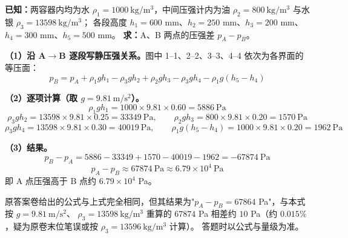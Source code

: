 \begin{jie}
\textbf{已知：}两容器内均为水 $\rho_1=1000\ \mathrm{kg/m^3}$，中间压强计内为油 $\rho_2=800\ \mathrm{kg/m^3}$ 与水银 $\rho_3=13598\ \mathrm{kg/m^3}$；
各段高度 $h_1=600$ mm、$h_2=250$ mm、$h_3=200$ mm、$h_4=300$ mm、$h_5=500$ mm。
\textbf{求：}A、B 两点的压强差 $p_A-p_B$。


\textbf{（1）沿 A$\rightarrow$B 逐段写静压强关系。}图中 1--1、2--2、3--3、4--4 依次为各界面的等压面：
\[
p_B=p_A+\rho_1gh_1-\rho_3gh_2+\rho_2gh_3-\rho_3gh_4-\rho_1g\left(h_5-h_4\right)
\]

\textbf{（2）逐项计算（取 $g=9.81\ \mathrm{m/s^2}$）。}
\[
\rho_1gh_1=1000\times9.81\times0.60=5886\ \mathrm{Pa}
\]
\[
\rho_3gh_2=13598\times9.81\times0.25=33349\ \mathrm{Pa},
\qquad
\rho_2gh_3=800\times9.81\times0.20=1570\ \mathrm{Pa}
\]
\[
\rho_3gh_4=13598\times9.81\times0.30=40019\ \mathrm{Pa},
\qquad
\rho_1g\left(h_5-h_4\right)=1000\times9.81\times0.20=1962\ \mathrm{Pa}
\]

\textbf{（3）结果。}
\[
p_B-p_A=5886-33349+1570-40019-1962=-67874\ \mathrm{Pa}
\]
\[
\boxed{p_A-p_B\approx67874\ \mathrm{Pa}\approx6.79\times10^4\ \mathrm{Pa}}
\]
即 A 点压强高于 B 点约 $6.79\times10^4$ Pa。
\end{jie}

\begin{tishi}
原答案卷给出的公式与上式完全相同，但其结果为"$p_A-p_B=67864$ Pa"，与本式按 $g=9.81\ \mathrm{m/s^2}$、
$\rho_3=13598\ \mathrm{kg/m^3}$ 重算的 $67874$ Pa 相差约 $10$ Pa（约 $0.015\%$，疑为原卷末位笔误或按 $\rho_3=13596\ \mathrm{kg/m^3}$ 计算）。
答题时以公式与量级为准。
\end{tishi}


